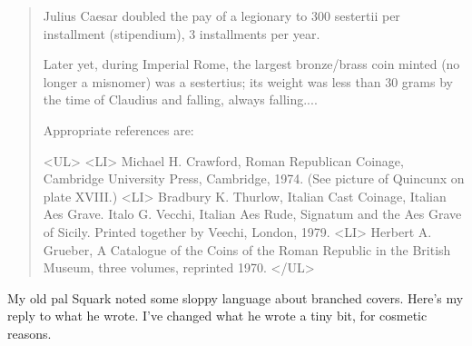 \begin{quote}
Julius Caesar doubled the pay of a legionary to 300 sestertii per 
installment (stipendium), 3 installments per year.

Later yet, during Imperial Rome, the largest bronze/brass coin minted 
(no longer a misnomer) was a sestertius; its weight was less than
30 grams by the time of Claudius and falling, always falling....

Appropriate references are:

<UL>
<LI>
Michael H. Crawford, Roman Republican Coinage, Cambridge University
Press, Cambridge, 1974.   (See picture of Quincunx on plate XVIII.)
<LI>
Bradbury K. Thurlow, 
Italian Cast Coinage, Italian Aes Grave.
Italo G. Vecchi, Italian Aes Rude, Signatum and the Aes Grave of Sicily.
Printed together by Veechi, London, 1979.
<LI>
Herbert A. Grueber,
A Catalogue of the Coins of the Roman Republic
in the British Museum, three volumes, reprinted 1970.
</UL>

\end{quote}
    

My old pal Squark noted some sloppy language about branched covers.  
Here's my reply to what he wrote.  I've changed what he wrote a tiny
bit, for cosmetic reasons.



